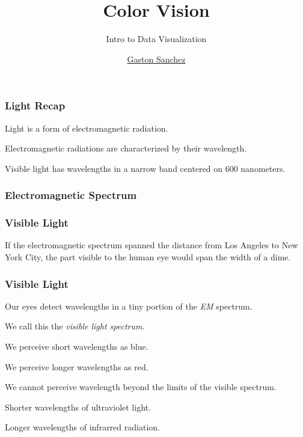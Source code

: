 \documentclass[12pt]{beamer}\usepackage[]{graphicx}\usepackage[]{color}
\title{Color Vision}
\subtitle{Intro to Data Visualization}
\author{\href{http://www.gastonsanchez.com}{Gaston Sanchez}}
\institute{\href{https://creativecommons.org/licenses/by-sa/4.0/}{\tt \scriptsize \color{foreground} CC BY-SA 4.0}}
\date{}
\begin{document}
{
  \frame{
    \titlepage
  } 
}


\begin{frame}
\begin{center}
\Huge{}
\end{center}
\end{frame}


\begin{frame}
\frametitle{Light Recap}

\bbi
  \item Light is a form of electromagnetic radiation.
  \item Electromagnetic radiations are characterized by their wavelength.
  \item Visible light has wavelengths in a narrow band centered on 600 nanometers.
\ei

\end{frame}


\begin{frame}
\frametitle{Electromagnetic Spectrum}
\begin{center}
\end{center}
\end{frame}


\begin{frame}
\frametitle{Visible Light}

If the electromagnetic spectrum spanned the distance from Los Angeles to New 
York City, the part visible to the human eye would span the width of a dime.
\eb

\end{frame}


\begin{frame}
\frametitle{Visible Light}

\bi
  \item Our eyes detect wavelengths in a tiny portion of the \textit{EM} spectrum.
  \item We call this the \textit{visible light spectrum}.
  \item We perceive short wavelengths as blue.
  \item We perceive longer wavelengths as red.
  \item We cannot perceive wavelength beyond the limits of the visible spectrum.
  \item Shorter wavelengths of ultraviolet light.
  \item Longer wavelengths of infrarred radiation.
\ei

\end{frame}
\end{document}
